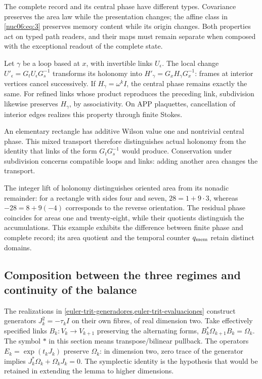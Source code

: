 The complete record and its central phase have different types. Covariance preserves the area law while the presentation changes; the affine class in \eqref{nuc06:eq:3} preserves memory content while its origin changes. Both properties act on typed path readers, and their maps must remain separate when composed with the exceptional readout of the complete state.

\begin{proposition}

Let \(\gamma\) be a loop based at \(x\), with invertible links \(U_\epsilon\). The local change \(U'_\epsilon=G_tU_\epsilon G_s^{-1}\) transforms its holonomy into \(H'_\gamma=G_xH_\gamma G_x^{-1}\): frames at interior vertices cancel successively. If \(H_\gamma=\omega^kI\), the central phase remains exactly the same. For refined links whose product reproduces the preceding link, subdivision likewise preserves \(H_\gamma\), by associativity. On APP plaquettes, cancellation of interior edges realizes this property through finite Stokes.
\end{proposition}

An elementary rectangle has additive Wilson value one and nontrivial central phase. This mixed transport therefore distinguishes actual holonomy from the identity that links of the form \(G_tG_s^{-1}\) would produce. Conservation under subdivision concerns compatible loops and links: adding another area changes the transport.

The integer lift of holonomy distinguishes oriented area from its nonadic remainder: for a rectangle with sides four and seven, \(28=1+9\cdot3\), whereas \(-28=8+9(-4)\) corresponds to the reverse orientation. The residual phase coincides for areas one and twenty-eight, while their quotients distinguish the accumulations. This example exhibits the difference between finite phase and complete record; its area quotient and the temporal counter \(q_{\rm mem}\) retain distinct domains.

\subsection{Composition between the three regimes and continuity of the balance}

The realizations in \cref{euler-trit-generadores,euler-trit-evaluaciones} construct generators \(J_k^2=-\tau_kI\) on their own fibres, of real dimension two. Take effectively specified links \(B_k:V_k\to V_{k+1}\) preserving the alternating forms, \(B_k^*\Omega_{k+1}B_k=\Omega_k\). The symbol \(*\) in this section means transpose/bilinear pullback. The operators \(E_k=\exp(t_kJ_k)\) preserve \(\Omega_k\): in dimension two, zero trace of the generator implies \(J_k^*\Omega_k+\Omega_kJ_k=0\). The symplectic identity is the hypothesis that would be retained in extending the lemma to higher dimensions.

